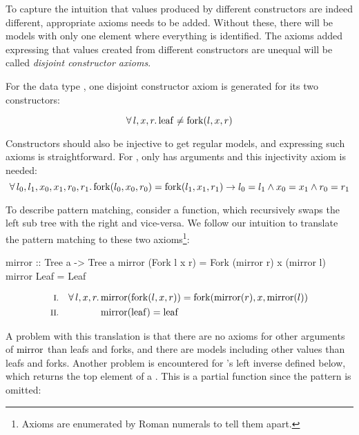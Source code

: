 \noindent
To capture the intuition that values produced by different
constructors are indeed different, appropriate axioms needs to be
added. Without these, there will be models with only one element where
everything is identified. The axioms added expressing that values
created from different constructors are unequal will be called
\emph{disjoint constructor axioms}.

\pagebreak
\noindent
For the data type , one disjoint constructor axiom is
generated for its two constructors:

\begin{equation*}
\forall \, l , x , r . \, \mathrm{leaf} \neq \mathrm{fork}(l,x,r)
\end{equation*}

Constructors should also be injective to get regular models, and
expressing such axioms is straightforward. For , only  has
arguments and this injectivity axiom is needed:
\begin{equation*}
\forall \, l_0 , l_1 , x_0 , x_1 , r_0 , r_1 . \, \mathrm{fork}(l_0,x_0,r_0) =
\mathrm{fork}(l_1,x_1,r_1) \rightarrow l_0 = l_1 \wedge x_0 = x_1 \wedge r_0 = r_1
\end{equation*}

To describe pattern matching, consider a  function, which
recursively swaps the left sub tree with the right and vice-versa. We
follow our intuition to translate the pattern matching to these
two axioms\footnote {Axioms are enumerated by Roman numerals to tell
  them apart.}:

\begin{code}
mirror :: Tree a -> Tree a
mirror (Fork l x r) = Fork (mirror r) x (mirror l)
mirror Leaf         = Leaf
\end{code}
\begin{align*}
\rom{1} && \faaa{l}{x}{r} & \fn{mirror}(\fn{fork}(l,x,r)) \eq \fn{fork}(\fn{mirror}(r),x,\fn{mirror}(l)) \\
\rom{2} &&                & \fn{mirror}(\fn{leaf}) \eq \fn{leaf}
\end{align*}

\noindent
A problem with this translation is that there are no axioms for other
arguments of $\mathrm{mirror}$ than leafs and forks, and there are models
including other values than leafs and forks. Another problem is
encountered for 's left inverse  defined below,
which returns the top element of a . This is a partial
function since the  pattern is omitted:

